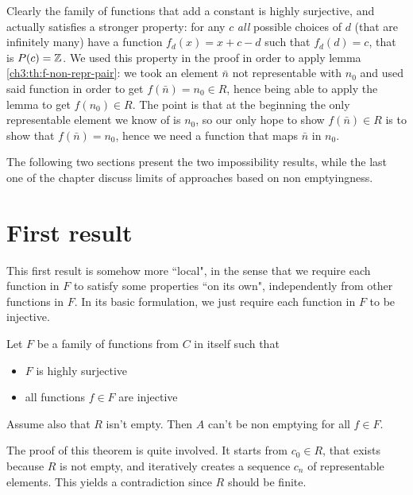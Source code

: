 Clearly the family of functions that add a constant is highly surjective, and actually satisfies a stronger property: for any $c$ \textit{all} possible choices of $d$ (that are infinitely many) have a function $f_d(x) = x + c - d$ such that $f_d(d) = c$, that is $P(c) = \mathbb{Z}$. We used this property in the proof in order to apply lemma \ref{ch3:th:f-non-repr-pair}: we took an element $\bar{n}$ not representable with $n_0$ and used said function in order to get $f(\bar{n}) = n_0 \in R$, hence being able to apply the lemma to get $f(n_0) \in R$. The point is that at the beginning the only representable element we know of is $n_0$, so our only hope to show $f(\bar{n}) \in R$ is to show that $f(\bar{n}) = n_0$, hence we need a function that maps $\bar{n}$ in $n_0$.

The following two sections present the two impossibility results, while the last one of the chapter discuss limits of approaches based on non emptyingness.

\section{First result}
This first result is somehow more ``local", in the sense that we require each function in $F$ to satisfy some properties ``on its own", independently from other functions in $F$. In its basic formulation, we just require each function in $F$ to be injective.

\begin{theorem}\label{ch4:th:non-empt-res-local-basic}
	Let $F$ be a family of functions from $C$ in itself such that
	\begin{itemize}
		\item $F$ is highly surjective
		\item all functions $f \in F$ are injective
	\end{itemize}
	Assume also that $R$ isn't empty. Then $A$ can't be non emptying for all $f \in F$.
\end{theorem}
The proof of this theorem is quite involved. It starts from $c_0 \in R$, that exists because $R$ is not empty, and iteratively creates a sequence $c_n$ of representable elements. This yields a contradiction since $R$ should be finite.

